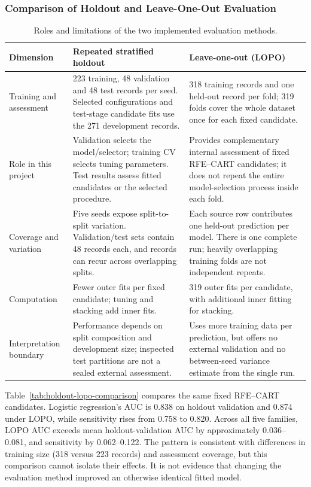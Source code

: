\subsubsection{Comparison of Holdout and Leave-One-Out Evaluation}
\label{par:holdout-lopo-discussion}
\begin{table}[H]
\centering\small
\caption{Roles and limitations of the two implemented evaluation methods.}
\label{tab:evaluation-method-comparison}
\begin{tabularx}{\textwidth}{@{}p{2.5cm}XX@{}}
\toprule
Dimension & Repeated stratified holdout & Leave-one-out (LOPO) \\
\midrule
Training and assessment &
223 training, 48 validation and 48 test records per seed. Selected
configurations and test-stage candidate fits use the 271 development records. &
318 training records and one held-out record per fold; 319 folds cover the
whole dataset once for each fixed candidate. \\
Role in this project &
Validation selects the model/selector; training CV selects tuning parameters.
Test results assess fitted candidates or the selected procedure. &
Provides complementary internal assessment of fixed RFE--CART candidates;
it does not repeat the entire model-selection process inside each fold. \\
Coverage and variation &
Five seeds expose split-to-split variation. Validation/test sets contain 48
records each, and records can recur across overlapping splits. &
Each source row contributes one held-out prediction per model. There is one
complete run; heavily overlapping training folds are not independent repeats. \\
Computation &
Fewer outer fits per fixed candidate; tuning and stacking add inner fits. &
319 outer fits per candidate, with additional inner fitting for stacking. \\
Interpretation boundary &
Performance depends on split composition and development size; inspected test
partitions are not a sealed external assessment. &
Uses more training data per prediction, but offers no external validation
and no between-seed variance estimate from the single run. \\
\bottomrule
\end{tabularx}
\end{table}

Table~\ref{tab:holdout-lopo-comparison} compares the same fixed RFE--CART
candidates. Logistic regression's AUC is 0.838 on holdout validation and
0.874 under LOPO, while sensitivity rises from 0.758 to 0.820. Across all
five families, LOPO AUC exceeds mean holdout-validation AUC by approximately
0.036--0.081, and sensitivity by 0.062--0.122. The pattern is consistent
with differences in training size (318 versus 223 records) and assessment
coverage, but this comparison cannot isolate their effects. It is not
evidence that changing the evaluation method improved an otherwise identical
fitted model.

